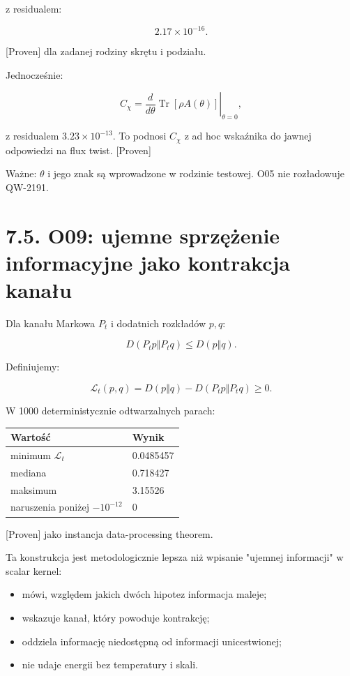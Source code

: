 \documentclass[11pt,a4paper,openany]{report}
\newcommand{\statusProven}{\textcolor{fingreen}{[Proven]}}
\begin{document}
z residualem:

\[
2.17\times10^{-16}.
\]

\statusProven{} dla zadanej rodziny skrętu i podziału.

Jednocześnie:

\[
C_\chi
=
\left.
\frac{d}{d\theta}\operatorname{Tr}[\rho A(\theta)]
\right|_{\theta=0},
\]

z residualem \(3.23\times10^{-13}\). To podnosi \(C_\chi\) z ad hoc wskaźnika do jawnej odpowiedzi na flux twist. \statusProven{}

Wa\.zne: \(\theta\) i jego znak są wprowadzone w rodzinie testowej. O05 nie rozładowuje QW-2191.

\section{7.5. O09: ujemne sprzę\.zenie informacyjne jako kontrakcja kanału}

Dla kanału Markowa \(P_t\) i dodatnich rozkładów \(p,q\):

\[
D(P_tp\Vert P_tq)\leq D(p\Vert q).
\]

Definiujemy:

\[
\mathcal L_t(p,q)
=D(p\Vert q)-D(P_tp\Vert P_tq)\geq0.
\]

W 1000 deterministycznie odtwarzalnych parach:

\begin{center}
\begingroup\small
\setlength{\tabcolsep}{2.5pt}
\renewcommand{\arraystretch}{1.16}
\begin{longtable}{@{}p{}p{}@{}}
\toprule
\textbf{Wartość} & \textbf{Wynik} \\
\midrule
\endhead
minimum \(\mathcal L_t\) & 0.0485457 \\
mediana & 0.718427 \\
maksimum & 3.15526 \\
naruszenia poni\.zej \(-10^{-12}\) & 0 \\
\bottomrule
\end{longtable}
\endgroup
\end{center}

\statusProven{} jako instancja data-processing theorem.

Ta konstrukcja jest metodologicznie lepsza ni\.z wpisanie "ujemnej informacji" w scalar kernel:

\begin{itemize}
\item 
mówi, względem jakich dwóch hipotez informacja maleje;

\item 
wskazuje kanał, który powoduje kontrakcję;

\item 
oddziela informację niedostępną od informacji unicestwionej;

\item 
nie udaje energii bez temperatury i skali.

\end{itemize}
\end{document}
